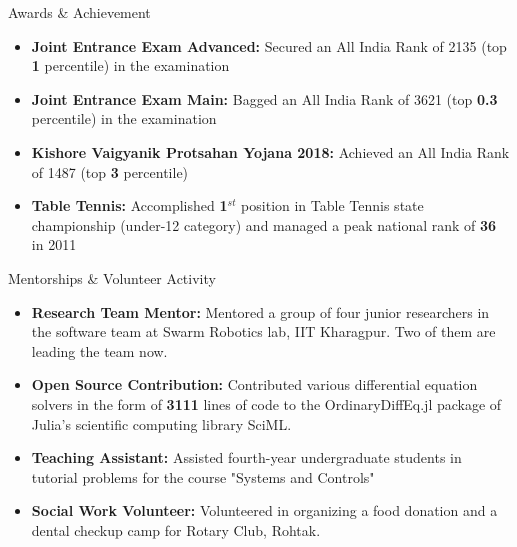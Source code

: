 \documentclass[40]{resume} %
\begin{document}
\begin{rSection}{Awards \& Achievement}
\vspace{0.2cm}
\begin{itemize}
  \setlength{\itemindent}{-1em}
  \item \textbf{Joint Entrance Exam Advanced:} Secured an All India Rank of 2135 (top \textbf{1} percentile) in the examination
  \item \textbf{Joint Entrance Exam Main:} Bagged an All India Rank of 3621 (top \textbf{0.3} percentile) in the examination
  \item \textbf{Kishore Vaigyanik Protsahan Yojana 2018:} Achieved an All India Rank of 1487 (top \textbf{3} percentile)
  \item \textbf{Table Tennis:} Accomplished \textbf{1$^{st}$} position in Table Tennis state championship (under-12 category) and managed a peak national rank of \textbf{36} in 2011
\end{itemize}

\end{rSection}



\begin{rSection}{Mentorships \& Volunteer Activity}
\vspace{0.3cm}
\begin{itemize}
  \setlength{\itemindent}{-1em}
  \item \textbf{Research Team Mentor:} Mentored a group of four junior researchers in the software team at Swarm Robotics lab, IIT Kharagpur. Two of them are leading the team now.
  \item \textbf{Open Source Contribution:} Contributed various differential equation solvers in the form of \textbf{3111} lines of code to the OrdinaryDiffEq.jl package of Julia's scientific computing library SciML.
  \item \textbf{Teaching Assistant:} Assisted fourth-year undergraduate students in tutorial problems for the course "Systems and Controls"
  \item \textbf{Social Work Volunteer:} Volunteered in organizing a food donation and a dental checkup camp for Rotary Club, Rohtak.
\end{itemize} 


\end{rSection}
\end{document}
